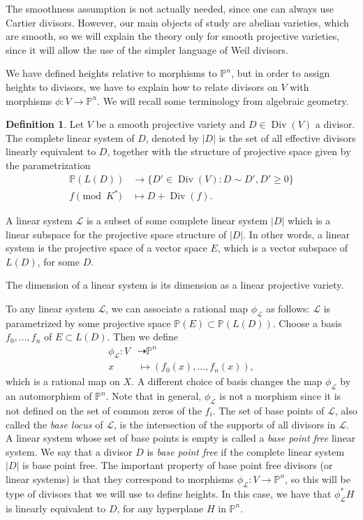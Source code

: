 \documentclass[a4paper, 12pt]{amsart}
\theoremstyle{definition}
\newtheorem{defn0}{Definition}[section]
\theoremstyle{plain}
\theoremstyle{plain}
\theoremstyle{plain}
\theoremstyle{plain}
\theoremstyle{remark}
\theoremstyle{remark}
\theoremstyle{plain}
\newenvironment{definition}{ \begin{defn0}}{\end{defn0}}
\DeclareMathOperator{\Div}{Div}
\begin{document}
	The smoothness assumption is not actually needed, since one can always use Cartier divisors. However, our main objects of study are abelian varieties, which are smooth, so we will explain the theory only for smooth projective varieties, since it will allow the use of the simpler language of Weil divisors.
	
	We have defined heights relative to morphisms to $\mathbb{P}^n$, but in order to assign heights to divisors, we have to explain how to relate divisors on $V$ with morphisms $\phi:V\rightarrow\mathbb{P}^n$. We will recall some terminology from algebraic geometry.
	\begin{definition}
		Let $V$ be a smooth projective variety and $D\in\Div(V)$ a divisor. The complete linear system of $D$, denoted by $|D|$ is the set of all effective divisors linearly equivalent to $D$, together with the structure of projective space given by the parametrization
		\begin{align*}
			\mathbb{P}(L(D))&\rightarrow \{D'\in\Div(V):D\sim D', D'\ge 0\}\\
			f\pmod{K^*}&\mapsto D+\Div(f).
		\end{align*}
				
		A linear system $\mathcal{L}$ is a subset of some complete linear system $|D|$ which is a linear subspace for the projective space structure of $|D|$. In other words, a linear system is the projective space of a vector space $E$, which is a vector subspace of $L(D)$, for some $D$.
		
		The dimension of a linear system is its dimension as a linear projective variety.
	\end{definition}
	To any linear system $\mathcal{L}$, we can associate a rational map $\phi_\mathcal{L}$ as follows: $\mathcal{L}$ is parametrized by some projective space $\mathbb{P}(E)\subset \mathbb{P}(L(D))$. Choose a basis $f_0,\ldots, f_n$ of $E\subset L(D)$. Then we define
	\begin{align*}
		\phi_\mathcal{L}:V&\dasharrow \mathbb{P}^n\\
		x&\mapsto (f_0(x),\ldots,f_n(x)),
	\end{align*}
	which is a rational map on $X$. A different choice of basis changes the map $\phi_\mathcal{L}$ by an automorphism of $\mathbb{P}^n$. Note that in general, $\phi_\mathcal{L}$ is not a morphism since it is not defined on the set of common zeros of the $f_i$. The set of base points of $\mathcal{L}$, also called the \emph{base locus} of $\mathcal{L}$, is the intersection of the supports of all divisors in $\mathcal{L}$. A linear system whose set of base points is empty is called a \emph{base point free} linear system. We say that a divisor $D$ is \emph{base point free} if the complete linear system $|D|$ is base point free. The important property of base point free divisors (or linear systems) is that they correspond to morphisms $\phi_\mathcal{L}:V\rightarrow\mathbb{P}^n$, so this will be type of divisors that we will use to define heights. In this case, we have that $\phi_\mathcal{L}^*H$ is linearly equivalent to $D$, for any hyperplane $H$ in $\mathbb{P}^n$.
	
\end{document}
